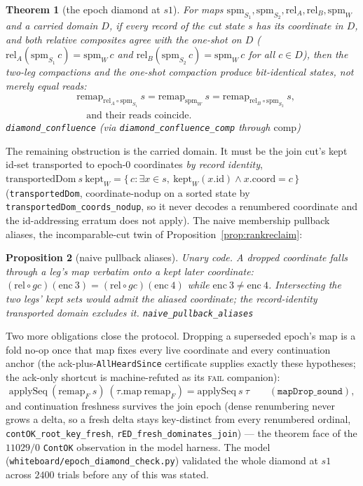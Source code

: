 \documentclass[11pt]{article}
\newtheorem{theorem}{Theorem}[section]
\newtheorem{proposition}[theorem]{Proposition}
\newcommand{\lean}[1]{\texttt{#1}}
\newcommand{\code}[1]{\texttt{#1}}
\begin{document}
\begin{theorem}[the epoch diamond at $s1$]
\label{thm:diamond}
For maps $\mathrm{spm}_{S_1}, \mathrm{spm}_{S_2}, \mathrm{rel}_A,
\mathrm{rel}_B, \mathrm{spm}_W$ and a carried domain $D$, if every
record of the cut state $s$ has its coordinate in $D$, and both relative
composites agree with the one-shot on $D$
($\mathrm{rel}_A(\mathrm{spm}_{S_1}\,c) = \mathrm{spm}_W\,c$ and
$\mathrm{rel}_B(\mathrm{spm}_{S_2}\,c) = \mathrm{spm}_W\,c$ for all $c \in
D$), then the two-leg compactions and the one-shot compaction produce
\emph{bit-identical} states, not merely equal reads:
\[
\begin{aligned}
  &\mathrm{remap}_{\mathrm{rel}_A \circ \mathrm{spm}_{S_1}}\ s
    = \mathrm{remap}_{\mathrm{spm}_W}\ s
    = \mathrm{remap}_{\mathrm{rel}_B \circ \mathrm{spm}_{S_2}}\ s, \\
  &\quad\text{and their reads coincide.}
\end{aligned}
\]
\hfill\lean{diamond\_confluence} (via \lean{diamond\_confluence\_comp}
through $\mathrm{comp}$)
\end{theorem}

\noindent The remaining obstruction is the carried domain. It
must be the join cut's kept id-set transported to epoch-$0$ coordinates
\emph{by record identity},
$\mathrm{transportedDom}\ s\ \mathrm{kept}_W = \{\,c : \exists x \in s,\
\mathrm{kept}_W(x.\mathrm{id}) \wedge x.\mathrm{coord} = c\,\}$
(\lean{transportedDom}, coordinate-nodup on a sorted state by
\lean{transportedDom\_coords\_nodup}, so it never decodes a renumbered
coordinate and the id-addressing erratum does not apply). The naive
membership pullback aliases, the incomparable-cut twin of
Proposition~\ref{prop:rankreclaim}:

\begin{proposition}[naive pullback aliases]
\label{prop:pullbackalias}
Unary code. A dropped coordinate falls through a leg's map verbatim onto
a kept later coordinate: $(\mathrm{rel} \circ gc)(\mathrm{enc}\ 3) =
(\mathrm{rel} \circ gc)(\mathrm{enc}\ 4)$ while $\mathrm{enc}\ 3 \neq
\mathrm{enc}\ 4$. Intersecting the two legs' kept sets would admit the
aliased coordinate; the record-identity transported domain excludes it.
\hfill\lean{naive\_pullback\_aliases}
\end{proposition}

\noindent Two more obligations close the protocol. Dropping a superseded
epoch's map is a fold no-op once that map fixes every live coordinate and
every continuation anchor (the ack-plus-\lean{AllHeardSince} certificate
supplies exactly these hypotheses; the ack-only shortcut is machine-refuted
as its \textsc{fail} companion):
\[
  \mathrm{applySeq}\ (\mathrm{remap}_F\ s)\ (\tau.\mathrm{map}\
  \mathrm{remap}_F) = \mathrm{applySeq}\ s\ \tau
  \qquad (\lean{mapDrop\_sound}),
\]
and continuation freshness survives the join epoch (dense renumbering
never grows a delta, so a fresh delta stays key-distinct from every
renumbered ordinal, \lean{contOK\_root\_key\_fresh},
\lean{rED\_fresh\_dominates\_join}) --- the theorem face of the
$11029/0$ \code{ContOK} observation in the model harness. The model
(\code{whiteboard/epoch\_diamond\_check.py}) validated the whole diamond
at $s1$ across $2400$ trials before any of this was stated.
\end{document}
